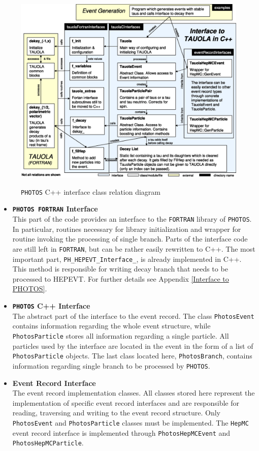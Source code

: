 \documentclass[]{Photos_interface_design}
\begin{document}
\begin{figure}[h!]
\centering
\includegraphics[scale=0.6]{interface_design.eps}
\label{fig:design}
\caption{{\tt PHOTOS} C++ interface class relation diagram}
\end{figure}

\begin{itemize}
  \item {\bf {\tt PHOTOS FORTRAN} Interface}\\
       This part of the code provides an interface 
       to the {\tt FORTRAN} library of {\tt PHOTOS}. In particular,  routines
       necessary for library initialization and wrapper for routine invoking the processing
	   of single branch. Parts of the interface code are still left in {\tt FORTRAN}, but
	   can be rather easily rewritten to C++. 
       The most important part, {\tt PH\_HEPEVT\_Interface\_},
       is already implemented  in C++. This method is responsible for writing
	   decay branch that needs to be processed to HEPEVT.
       For further details see Appendix \ref{Interface to PHOTOS}.
  \item {\bf {\tt PHOTOS} C++ Interface} \\
       The abstract part of the interface to the event record.
       The class {\tt PhotosEvent} contains information regarding the whole event
       structure, while {\tt PhotosParticle} stores all information regarding a single particle.
       All particles used by the interface are located in the event in the form of
       a list of {\tt PhotosParticle} objects.
       The last class located here, {\tt PhotosBranch}, contains information regarding
	   single branch to be processed by {\tt PHOTOS}.
  \item {\bf Event Record Interface} \\
       The event record implementation classes. All classes stored here represent
       the implementation of specific event record interfaces and are responsible for reading,
       traversing and writing to the event record structure.
       Only {\tt PhotosEvent} and {\tt PhotosParticle} classes must be implemented.
       The {\tt HepMC} event record interface is implemented
       through {\tt PhotosHepMCEvent} and {\tt PhotosHepMCParticle}.
\end{itemize}
\end{document}
